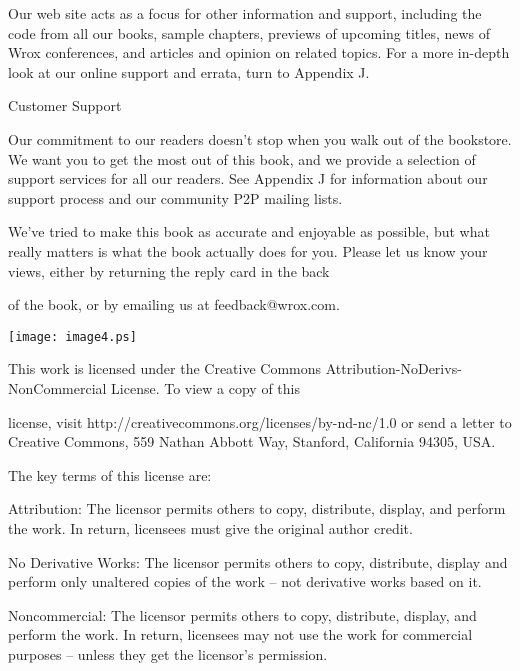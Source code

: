 \documentclass[a4paper,11pt]{book}
\begin{document}
\noindent 

\noindent Our web site acts as a focus for  other  information  and  support,  including  the code  from  all  our  books, sample  chapters,  previews of  upcoming  titles,  news  of  Wrox  conferences,  and articles  and  opinion  on related topics.  For a more in-depth  look  at  our  online  support  and  errata,  turn  to  Appendix J.

\noindent 

\noindent 

\noindent Customer Support

\noindent 

\noindent Our commitment to our readers doesn't stop when you walk out of the bookstore. We want you to get the most out of this book, and we provide a selection of support services for all our readers. See Appendix J for information about our support process and our community P2P mailing lists.

\noindent 

\noindent We've tried to make this book as accurate and enjoyable as possible, but what really matters is what the book actually does for you. Please let us know your views, either by returning the reply card in the back

\noindent of the book, or by emailing us at feedback@wrox.com.

\noindent  

\noindent  

\noindent  

\noindent  

\noindent 

\noindent \texttt{[image: image4.ps]}

\noindent 

\noindent This work is licensed under the Creative Commons Attribution-NoDerivs-NonCommercial License. To view a copy of this

\noindent license, visit http://creativecommons.org/licenses/by-nd-nc/1.0 or send a letter to Creative Commons, 559 Nathan Abbott Way, Stanford, California 94305, USA.

\noindent 

\noindent The key terms of this license are:

\noindent 

\noindent Attribution: The licensor permits others to copy, distribute, display, and perform the work. In return, licensees must give the original author credit.

\noindent 

\noindent No  Derivative  Works: The licensor permits others to copy, distribute, display and perform only unaltered copies of the work -- not derivative works based on it.

\noindent 

\noindent Noncommercial: The licensor permits others to copy, distribute, display, and perform the work. In return, licensees may not use the work for commercial purposes -- unless they get the licensor's permission.
\end{document}
